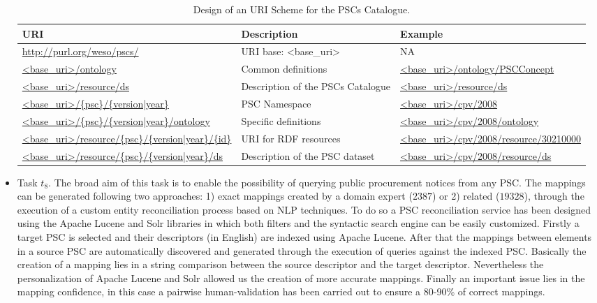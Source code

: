 \begin{itemize}
 \begin{table}[!ht]
\renewcommand{\arraystretch}{1.3}
\begin{center}
\begin{tabular}[c]{|p{5cm}|p{4.5cm}|p{5cm}|} 
\hline
  \textbf{URI} &  \textbf{Description} & \textbf{Example} \\\hline
  \url{http://purl.org/weso/pscs/} & URI base: <base\_uri> & NA \\ \hline
  \url{<base_uri>/ontology} & Common definitions & \url{<base_uri>/ontology/PSCConcept} \\ \hline
  \url{<base_uri>/resource/ds} & Description of the PSCs Catalogue & \url{<base_uri>/resource/ds} \\ \hline
  \url{<base_uri>/{psc}/{version|year}} & PSC Namespace & \url{<base_uri>/cpv/2008} \\ \hline
  \url{<base_uri>/{psc}/{version|year}/ontology} & Specific definitions & \url{<base_uri>/cpv/2008/ontology} \\ \hline
  \url{<base_uri>/resource/{psc}/{version|year}/{id}} & URI for RDF resources & \url{<base_uri>/cpv/2008/resource/30210000} \\ \hline
  \url{<base_uri>/resource/{psc}/{version|year}/ds} & Description of the PSC dataset  & \url{<base_uri>/cpv/2008/resource/ds} \\ \hline
\hline
\end{tabular}
\caption{Design of an URI Scheme for the PSCs Catalogue.}\label{table:pscs-uri}
  \end{center}
\end{table} 

\item Task $t_8$. The broad aim of this task is to enable the possibility of querying public procurement notices from any PSC. The mappings can be generated following two approaches: 
1) exact mappings created by a domain expert ($2387$) or 2) related ($19328$), through the execution of a custom entity reconciliation process 
based on NLP techniques. To do so a PSC reconciliation service has been designed using the Apache Lucene and Solr libraries in which
both filters and the syntactic search engine can be easily customized. Firstly a target PSC is selected and their descriptors (in English) 
are indexed using Apache Lucene. After that the mappings between elements in a source PSC are automatically discovered and generated through the execution 
of queries against the indexed PSC. Basically the creation of a mapping lies in a string comparison between the source descriptor and the 
target descriptor. Nevertheless the personalization of Apache Lucene and Solr allowed us the creation of more accurate mappings. Finally 
an important issue lies in the mapping confidence, in this case a pairwise human-validation has been carried out to ensure a 80-90\% of 
correct mappings.


\end{itemize}
